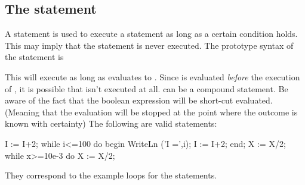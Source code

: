 \documentclass{report}
\begin{document}
\subsection{The  statement}
A  statement is used to execute a statement as long as a certain
condition holds. This may imply that the statement is never executed.  
The prototype syntax of the  statement is

This will execute  as long as  evaluates to
. Since  is evaluated {\em before} the execution
of , it is possible that  isn't executed at
all.  can be a compound statement.
Be aware of the fact that the boolean expression  will be 
short-cut evaluated. (Meaning that the evaluation will be stopped at the 
point where the outcome is known with certainty)
The following are valid  statements:
\begin{listing}
I := I+2;
while i<=100 do
  begin
  WriteLn ('I =',i);
  I := I+2;
  end;
X := X/2;
while x>=10e-3 do
  X := X/2;
\end{listing}
They correspond to the example loops for the  statements.
\end{document}
